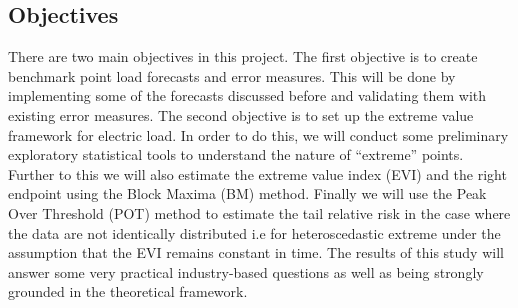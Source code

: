 \documentclass[a4paper]{article}
\begin{document}
\subsection{Objectives}
\label{subsec:objectives}
There are two main objectives in this project. The first objective is to create benchmark point load forecasts and error measures. This will be done by implementing some of the forecasts discussed before and validating them with existing error measures. The second objective is to set up the extreme value framework for electric load. In order to do this, we will conduct some preliminary exploratory statistical tools to understand the nature of ``extreme'' points. Further to this we will also estimate the extreme value index (EVI) and the right endpoint using the Block Maxima (BM) method. Finally we will use the Peak Over Threshold (POT) method to estimate the tail relative risk in the case where the data are not identically distributed i.e for heteroscedastic extreme under the assumption that the EVI remains constant in time. The results of this study will answer some very practical industry-based questions as well as being strongly grounded in the theoretical framework.




\end{document}

